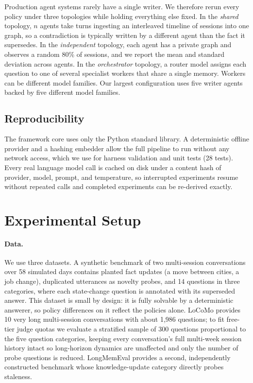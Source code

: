 \documentclass[letterpaper]{article} %
\begin{document}
Production agent systems rarely have a single writer. We therefore rerun every policy under three topologies while holding everything else fixed. In the \emph{shared} topology, $n$ agents take turns ingesting an interleaved timeline of sessions into one graph, so a contradiction is typically written by a different agent than the fact it supersedes. In the \emph{independent} topology, each agent has a private graph and observes a random 80\% of sessions, and we report the mean and standard deviation across agents. In the \emph{orchestrator} topology, a router model assigns each question to one of several specialist workers that share a single memory. Workers can be different model families. Our largest configuration uses five writer agents backed by five different model families.

\subsection{Reproducibility}

The framework core uses only the Python standard library. A deterministic offline provider and a hashing embedder allow the full pipeline to run without any network access, which we use for harness validation and unit tests (28 tests). Every real language model call is cached on disk under a content hash of provider, model, prompt, and temperature, so interrupted experiments resume without repeated calls and completed experiments can be re-derived exactly.

\section{Experimental Setup}

\paragraph{Data.} We use three datasets. A synthetic benchmark of two multi-session conversations over 58 simulated days contains planted fact updates (a move between cities, a job change), duplicated utterances as novelty probes, and 14 questions in three categories, where each state-change question is annotated with its superseded answer. This dataset is small by design: it is fully solvable by a deterministic answerer, so policy differences on it reflect the policies alone. LoCoMo \citep{maharana2024locomo} provides 10 very long multi-session conversations with about 1,986 questions; to fit free-tier judge quotas we evaluate a stratified sample of 300 questions proportional to the five question categories, keeping every conversation's full multi-week session history intact so long-horizon dynamics are unaffected and only the number of probe questions is reduced. LongMemEval \citep{wu2025longmemeval} provides a second, independently constructed benchmark whose knowledge-update category directly probes staleness.
\end{document}
